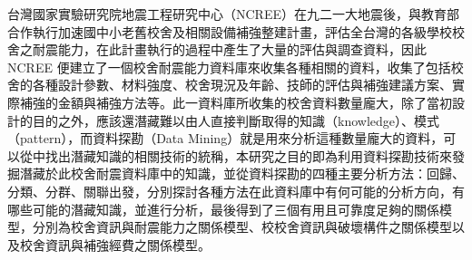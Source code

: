 
台灣國家實驗研究院地震工程研究中心（NCREE）在九二一大地震後，與教育部合作執行加速國中小老舊校舍及相關設備補強整建計畫，評估全台灣的各級學校校舍之耐震能力，在此計畫執行的過程中產生了大量的評估與調查資料，因此 NCREE 便建立了一個校舍耐震能力資料庫來收集各種相關的資料，收集了包括校舍的各種設計參數、材料強度、校舍現況及年齡、技師的評估與補強建議方案、實際補強的金額與補強方法等。此一資料庫所收集的校舍資料數量龐大，除了當初設計的目的之外，應該還潛藏難以由人直接判斷取得的知識（knowledge）、模式（pattern），而資料探勘（Data Mining）就是用來分析這種數量龐大的資料，可以從中找出潛藏知識的相關技術的統稱，本研究之目的即為利用資料探勘技術來發掘潛藏於此校舍耐震資料庫中的知識，並從資料探勘的四種主要分析方法：回歸、分類、分群、關聯出發，分別探討各種方法在此資料庫中有何可能的分析方向，有哪些可能的潛藏知識，並進行分析，最後得到了三個有用且可靠度足夠的關係模型，分別為校舍資訊與耐震能力之關係模型、校校舍資訊與破壞構件之關係模型以及校舍資訊與補強經費之關係模型。
	